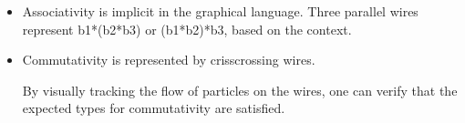 \documentclass[preprint]{sigplanconf}
\begin{document}
\begin{itemize}
\item Associativity is implicit in the graphical language. Three parallel
  wires represent {{b1*(b2*b3)}} or {{(b1*b2)*b3}}, based on the context.
\begin{center}
\end{center}

\item Commutativity is represented by crisscrossing wires.
\begin{multicols}{2}
\begin{center}
\end{center}
\begin{center}
\end{center}
\end{multicols}

By visually tracking the flow of particles on the wires, one can
verify that the expected types for commutativity are satisfied.

\begin{multicols}{2}
\begin{center}
\end{center}
\begin{center}
\end{center}
\end{multicols}



\end{itemize}
\end{document}
